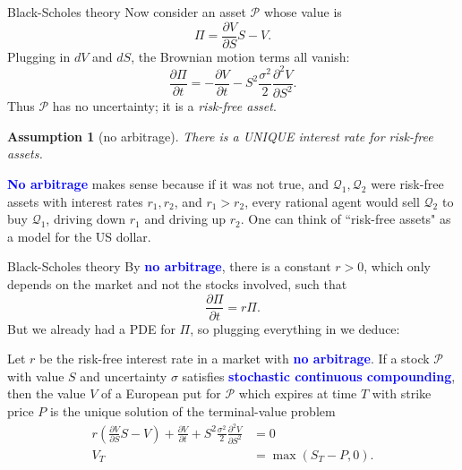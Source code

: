 \documentclass[10pt]{beamer}
\newtheorem{assumption}{Assumption}
\newcommand{\attn}[1]{\textbf{\textcolor{blue}{#1}}}
\begin{document}
\begin{frame}{Black-Scholes theory}
Now consider an asset $\mathcal P$ whose value is
$$\Pi = \frac{\partial V}{\partial S}S - V.$$
Plugging in $dV$ and $dS$, the Brownian motion terms all vanish:
$$\frac{\partial \Pi}{\partial t} = -\frac{\partial V}{\partial t} - S^2\frac{\sigma^2}{2} \frac{\partial^2 V}{\partial S^2}.$$
Thus $\mathcal P$ has no uncertainty; it is a \emph{risk-free asset}.

\begin{assumption}[no arbitrage]
There is a UNIQUE interest rate for risk-free assets.
\end{assumption}

\attn{No arbitrage} makes sense because if it was not true, and $\mathcal Q_1,\mathcal Q_2$ were risk-free assets with interest rates $r_1,r_2$, and $r_1 > r_2$, every rational agent would sell $\mathcal Q_2$ to buy $\mathcal Q_1$, driving down $r_1$ and driving up $r_2$. One can think of ``risk-free assets" as a model for the US dollar.
\end{frame}

\begin{frame}{Black-Scholes theory}
By \attn{no arbitrage}, there is a constant $r > 0$, which only depends on the market and not the stocks involved, such that
$$\frac{\partial \Pi}{\partial t} = r\Pi.$$
But we already had a PDE for $\Pi$, so plugging everything in we deduce:
\begin{theorem}
Let $r$ be the risk-free interest rate in a market with \attn{no arbitrage}.
If a stock $\mathcal P$ with value $S$ and uncertainty $\sigma$ satisfies \attn{stochastic continuous compounding}, then the value $V$ of a European put for $\mathcal P$ which expires at time $T$ with strike price $P$ is the unique solution of the terminal-value problem
\begin{align*}
r\left(\frac{\partial V}{\partial S}S - V\right) + \frac{\partial V}{\partial t} + S^2\frac{\sigma^2}{2} \frac{\partial^2 V}{\partial S^2} &= 0\\
V_T &= \max(S_T - P, 0).
\end{align*}
\end{theorem}
\end{frame}
\end{document}
